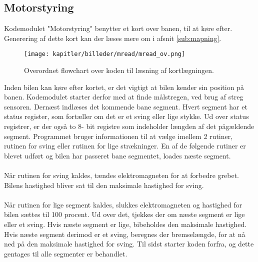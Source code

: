 \newpage

\subsection{Motorstyring}

Kodemodulet "Motorstyring"  benytter et kort over banen, til at køre efter. Generering af dette kort kan der læses mere om i afsnit \ref{sub:mapning}.

\begin{figure}[ht]
\centering
\texttt{[image: kapitler/billeder/mread/mread\_ov.png]}
\caption{Overordnet flowchart over koden til læsning af kortlægningen.}
\label{fig:mread}
\end{figure}

Inden bilen kan køre efter kortet, er det vigtigt at bilen kender sin position på banen. Kodemodulet starter derfor med at finde målstregen, ved brug af streg sensoren. Dernæst indlæses det kommende bane segment. Hvert segment har et status register, som fortæller om det er et sving eller lige stykke. Ud over status registrer, er der også to 8- bit registre som indeholder længden af det pågældende segment. Programmet bruger informationen til at vælge imellem 2 rutiner, rutinen for sving eller rutinen for lige strækninger. En af de følgende rutiner er blevet udført og bilen har passeret bane segmentet, loades næste segment.\\
\\
Når rutinen for sving kaldes, tændes elektromagneten for at forbedre grebet. Bilens hastighed bliver sat til den maksimale hastighed for sving.\\
\\
Når rutinen for lige segment kaldes, slukkes elektromagneten og hastighed for bilen sættes til 100 procent. Ud over det, tjekkes der om næste segment er lige eller et sving. Hvis næste segment er lige, bibeholdes den maksimale hastighed. Hvis næste segment derimod er et sving, beregnes der bremselængde, for at nå ned på den maksimale hastighed for sving. Til sidst starter koden forfra, og dette gentages til alle segmenter er behandlet.
